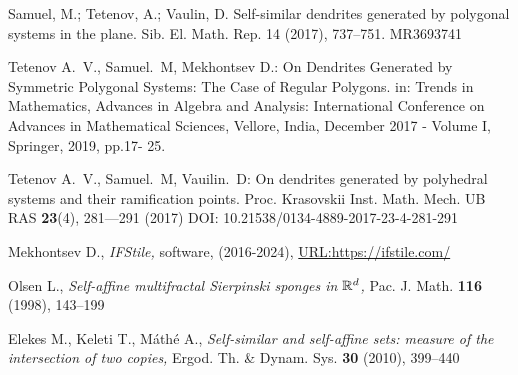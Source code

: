 \begin{thebibliography}{99}
Samuel, M.; Tetenov, A.; Vaulin, D. Self-similar dendrites generated by polygonal systems in the plane. Sib. El. Math. Rep. 14 (2017), 737--751. MR3693741

Tetenov A.~V., Samuel.~M, Mekhontsev D.:
On Dendrites Generated by Symmetric 
Polygonal Systems: The Case of Regular 
Polygons. in:  Trends in Mathematics, Advances in Algebra and Analysis: International Conference on Advances in Mathematical Sciences, Vellore, India, December 2017 - Volume I,  Springer, 2019, pp.17- 25.

Tetenov A.~V., Samuel.~M, Vauilin.~D:
On dendrites generated by polyhedral systems and their ramification points.  Proc.  Krasovskii Inst. Math. Mech. UB RAS \textbf{23}(4), 281---291 (2017) DOI: 10.21538/0134-4889-2017-23-4-281-291




    {\sc Mekhontsev D.,}
    {\em IFStile,} 
    {software, (2016-2024), \href{https://ifstile.com/}{URL:https://ifstile.com/}} 

    {\sc Olsen L.,}
    {\em Self-affine multifractal Sierpinski sponges in $\mathbb{R}^d$,}
    {Pac. J. Math. \textbf{116} (1998), 143--199}

    {\sc Elekes M., Keleti T., M\'ath\'e A.,}
    {\em Self-similar and self-affine sets: measure of the intersection of two copies,}
    {Ergod. Th. \& Dynam. Sys. \textbf{30} (2010), 399--440}


\end{thebibliography}
